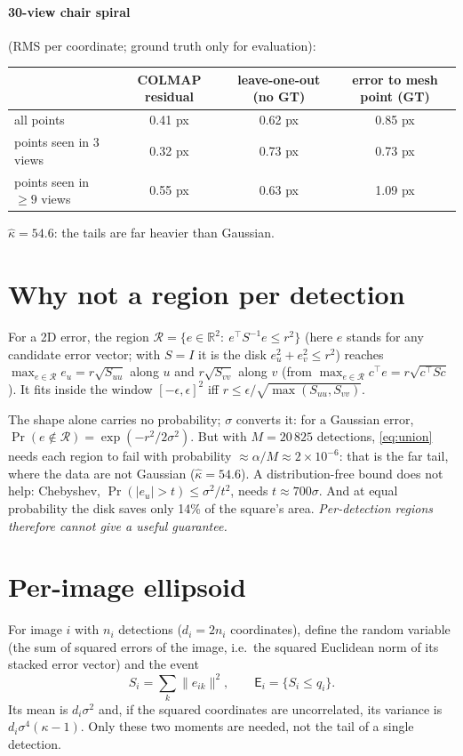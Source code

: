 \documentclass[11pt]{article}
\newcommand{\R}{\mathbb{R}}
\begin{document}
\paragraph{30-view chair spiral} (RMS per coordinate; ground truth only for evaluation):
\begin{center}
\begin{tabular}{lccc}
\toprule
 & COLMAP residual & leave-one-out (no GT) & error to mesh point (GT)\\
\midrule
all points & 0.41 px & 0.62 px & 0.85 px\\
points seen in 3 views & 0.32 px & 0.73 px & 0.73 px\\
points seen in $\ge 9$ views & 0.55 px & 0.63 px & 1.09 px\\
\bottomrule
\end{tabular}
\end{center}
$\hat\kappa=54.6$: the tails are far heavier than Gaussian.

\section{Why not a region per detection}
For a 2D error, the region $\mathcal R=\{e\in\R^2:\ e^\top S^{-1}e\le r^2\}$ (here $e$ stands for any candidate error
vector; with $S=I$ it is the disk $e_u^2+e_v^2\le r^2$) reaches $\max_{e\in\mathcal R}e_u=r\sqrt{S_{uu}}$ along $u$ and
$r\sqrt{S_{vv}}$ along $v$ (from $\max_{e\in\mathcal R}c^\top e=r\sqrt{c^\top S c}$). It fits inside the window
$[-\epsilon,\epsilon]^2$ iff $r\le\epsilon/\sqrt{\max(S_{uu},S_{vv})}$.

The shape alone carries no probability; $\sigma$ converts it: for a Gaussian error,
$\Pr(e\notin\mathcal R)=\exp(-r^2/2\sigma^2)$. But with $M=20\,825$ detections, \eqref{eq:union} needs each region
to fail with probability $\approx\alpha/M\approx2\times10^{-6}$: that is the far tail, where the data are not Gaussian
($\hat\kappa=54.6$). A distribution-free bound does not help: Chebyshev, $\Pr(|e_u|>t)\le\sigma^2/t^2$, needs
$t\approx700\sigma$. And at equal probability the disk saves only 14\% of the square's area.
\emph{Per-detection regions therefore cannot give a useful guarantee.}

\section{Per-image ellipsoid}
For image $i$ with $n_i$ detections ($d_i=2n_i$ coordinates), define the random variable (the sum of squared errors of the image, i.e.\ the squared
Euclidean norm of its stacked error vector) and the event
\begin{equation}
  S_i=\sum_k\|e_{ik}\|^2,\qquad \mathsf E_i=\{S_i\le q_i\}.
\end{equation}
Its mean is $d_i\sigma^2$ and, if the squared coordinates are uncorrelated, its variance is $d_i\sigma^4(\kappa-1)$.
Only these two moments are needed, not the tail of a single detection.
\end{document}
